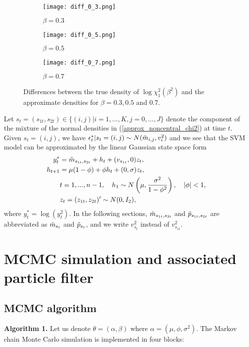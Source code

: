\begin{figure}[H]
    \centering
    \begin{subfigure}{0.325\linewidth}
        \centering
        \texttt{[image: diff\_0\_3.png]}
        \caption{$\beta = 0.3$}
    \end{subfigure}
    \hfill
    \begin{subfigure}{0.325\linewidth}
        \centering
        \texttt{[image: diff\_0\_5.png]}
        \caption{$\beta = 0.5$}
    \end{subfigure}
    \hfill
    \begin{subfigure}{0.325\linewidth}
        \centering
        \texttt{[image: diff\_0\_7.png]}
        \caption{$\beta = 0.7$}
    \end{subfigure}
    \caption{Differences between the true density of $\log \chi_1^2(\beta^2)$ and the approximate densities for $\beta = 0.3,0.5$ and $0.7$.}
    \label{fig:diff}
\end{figure}
\noindent
Let $s_t = (s_{1t}, s_{2t}) \in \{ (i,j) | i=1,...,K, j=0,...,J \}$ denote the component of the mixture of the normal densities in (\ref{approx_noncentral_chi2}) at time $t$.
Given $s_t = (i,j)$, we have $\epsilon_t^* | s_t=(i,j) \sim N(\Tilde{m}_{i,j}, v_i^2)$ and we see that the SVM model can be approximated by the linear Gaussian state space form
\begin{align}
    y_t^* &= \Tilde{m}_{s_{1t}, s_{2t}} + h_t + (v_{s_{1t}}, 0) z_t, \label{approx_linaer_start} \\
    h_{t+1} &= \mu(1-\phi) + \phi h_t + (0, \sigma) z_t, \nonumber \\
    &t = 1,...,n-1, \quad h_1 \sim N\left( \mu, \frac{\sigma^2}{1-\phi^2} \right), \quad
    |\phi| < 1, \label{approx_linaer_end} \\
    &z_t = (z_{1t}, z_{2t})' \sim N(0, I_2), \nonumber
\end{align}
where $y_t^* = \log(y_t^2)$.
In the following sections, $\Tilde{m}_{s_{1t}, s_{2t}}$ and $\Tilde{p}_{s_{1t}, s_{2t}}$ are abbreviated as $\Tilde{m}_{s_t}$ and $\Tilde{p}_{s_t}$, and we write $v_{s_t}^2$ instead of $v_{s_{1t}}^2$.
\section{MCMC simulation and associated particle filter}
\subsection{MCMC algorithm}
\textbf{Algorithm 1.}
Let us denote $\theta = (\alpha,\beta)$ where $\alpha = (\mu,\phi,\sigma^2)$.
The Markov chain Monte Carlo simulation is implemented in four blocks:

